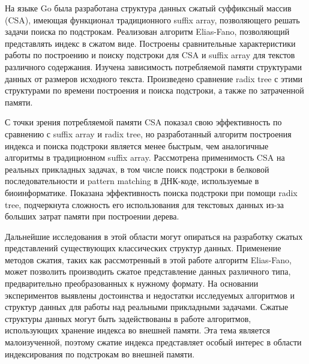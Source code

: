 
На языке Go была разработана структура данных сжатый суффиксный массив (CSA), имеющая
функционал традиционного suffix array, позволяющего решать задачи поиска по подстрокам.
Реализован алгоритм Elias-Fano, позволяющий представлять индекс в сжатом виде.
Построены сравнительные характеристики работы по построению и поиску подстроки
для CSA и suffix array для текстов различного содержания.
Изучена зависимость потребляемой памяти структурами данных от размеров исходного текста.
Произведено сравнение radix tree с этими структурами по времени построения и поиска подстроки,
а также по затраченной памяти.

С точки зрения потребляемой памяти CSA показал свою эффективность по сравнению с suffix array и radix tree,
но разработанный алгоритм построения индекса и поиска подстроки является менее быстрым,
чем аналогичные алгоритмы в традиционном suffix array. Рассмотрена применимость CSA на реальных
прикладных задачах, в том числе поиск подстроки в белковой последовательности
и pattern matching в ДНК-коде, используемые в биоинформатике.
Показана эффективность поиска подстроки при помощи radix tree,
подчеркнута сложность его использования для текстовых данных из-за больших
затрат памяти при построении дерева.

Дальнейшие исследования в этой области могут опираться на разработку сжатых представлений существующих
классических структур данных. Применение методов сжатия,
таких как рассмотренный в этой работе алгоритм Elias-Fano, может позволить производить сжатое представление
данных различного типа, предварительно преобразованных к нужному формату.
На основании экспериментов выявлены достоинства и недостатки исследуемых алгоритмов и структур данных
для работы над реальными прикладными задачами.
Сжатые структуры данных могут быть задействованы в работе алгоритмов,
использующих хранение индекса во внешней памяти. Эта тема является малоизученной, поэтому
сжатие индекса представляет особый интерес в области индексирования по подстрокам во внешней памяти.

